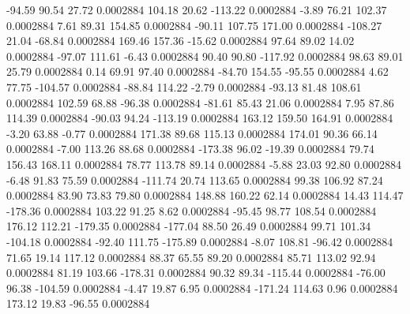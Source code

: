       -94.59       90.54       27.72     0.0002884
      104.18       20.62     -113.22     0.0002884
       -3.89       76.21      102.37     0.0002884
        7.61       89.31      154.85     0.0002884
      -90.11      107.75      171.00     0.0002884
     -108.27       21.04      -68.84     0.0002884
      169.46      157.36      -15.62     0.0002884
       97.64       89.02       14.02     0.0002884
      -97.07      111.61       -6.43     0.0002884
       90.40       90.80     -117.92     0.0002884
       98.63       89.01       25.79     0.0002884
        0.14       69.91       97.40     0.0002884
      -84.70      154.55      -95.55     0.0002884
        4.62       77.75     -104.57     0.0002884
      -88.84      114.22       -2.79     0.0002884
      -93.13       81.48      108.61     0.0002884
      102.59       68.88      -96.38     0.0002884
      -81.61       85.43       21.06     0.0002884
        7.95       87.86      114.39     0.0002884
      -90.03       94.24     -113.19     0.0002884
      163.12      159.50      164.91     0.0002884
       -3.20       63.88       -0.77     0.0002884
      171.38       89.68      115.13     0.0002884
      174.01       90.36       66.14     0.0002884
       -7.00      113.26       88.68     0.0002884
     -173.38       96.02      -19.39     0.0002884
       79.74      156.43      168.11     0.0002884
       78.77      113.78       89.14     0.0002884
       -5.88       23.03       92.80     0.0002884
       -6.48       91.83       75.59     0.0002884
     -111.74       20.74      113.65     0.0002884
       99.38      106.92       87.24     0.0002884
       83.90       73.83       79.80     0.0002884
      148.88      160.22       62.14     0.0002884
       14.43      114.47     -178.36     0.0002884
      103.22       91.25        8.62     0.0002884
      -95.45       98.77      108.54     0.0002884
      176.12      112.21     -179.35     0.0002884
     -177.04       88.50       26.49     0.0002884
       99.71      101.34     -104.18     0.0002884
      -92.40      111.75     -175.89     0.0002884
       -8.07      108.81      -96.42     0.0002884
       71.65       19.14      117.12     0.0002884
       88.37       65.55       89.20     0.0002884
       85.71      113.02       92.94     0.0002884
       81.19      103.66     -178.31     0.0002884
       90.32       89.34     -115.44     0.0002884
      -76.00       96.38     -104.59     0.0002884
       -4.47       19.87        6.95     0.0002884
     -171.24      114.63        0.96     0.0002884
      173.12       19.83      -96.55     0.0002884
